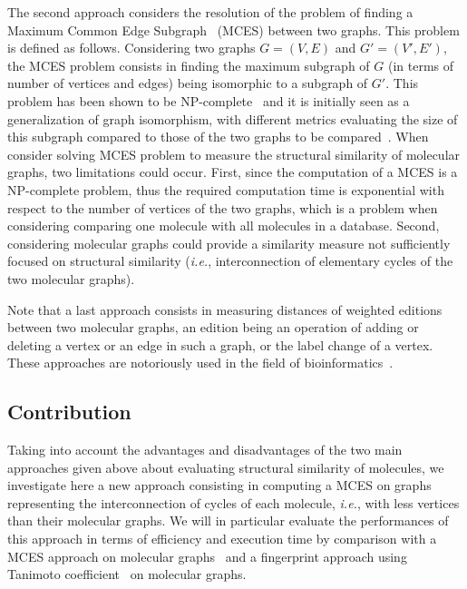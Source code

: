 \documentclass[10pt,letterpaper]{article}
\begin{document}
The second approach considers the resolution of the problem of finding a Maximum Common Edge Subgraph~\cite{Raymond2002} (MCES) between two graphs. This problem is defined as follows. Considering two graphs $G = (V , E )$ and $G′ = (V ′, E′)$, the MCES problem consists in finding the maximum subgraph of $G$ (in terms of number of vertices and edges) being isomorphic to a subgraph of $G′$. This problem has been shown to be NP-complete~\cite{Raymond2002} and it is initially seen as a generalization of graph isomorphism, with different metrics evaluating the size of this subgraph compared to those of the two graphs to be compared~\cite{Faisal2007,Eckert2007,Zager2008,Akutsu2013}. When consider solving MCES problem to measure the structural similarity of molecular graphs, two limitations could occur. First, since the computation of a MCES is a NP-complete problem, thus the required computation time is exponential with respect to the number of vertices of the two graphs, which is a problem when considering comparing one molecule with all molecules in a database. Second, considering molecular graphs could provide a similarity measure not sufficiently focused on structural similarity (\textit{i.e.}, interconnection of elementary cycles of the two molecular graphs).

Note that a last approach consists in measuring distances of weighted editions between two molecular graphs, an edition being an operation of adding or deleting a vertex or an edge in such a graph, or the label change of a vertex. These approaches are notoriously used in the field of bioinformatics~\cite{Neuhaus2007,Sayle2015}.

\subsection*{Contribution}
Taking into account the advantages and disadvantages of the two main approaches given above about evaluating structural similarity of molecules, we investigate here a new approach consisting in computing a MCES on graphs representing the interconnection of cycles of each molecule, \textit{i.e.}, with less vertices than their molecular graphs. We will in particular evaluate the performances of this approach in terms of efficiency and execution time by comparison with a MCES approach on molecular graphs~\cite{Raymond2002} and a fingerprint approach using Tanimoto coefficient~\cite{Tanimoto1960} on molecular graphs.
\end{document}
